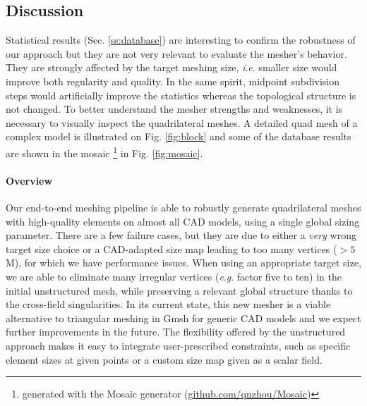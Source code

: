\documentclass[AMA,STIX1COL]{WileyNJD-v2}
\newcommand{\ie}{\textit{i}.\textit{e}. }
\newcommand{\eg}{\textit{e}.\textit{g}. }
\newcommand\rsec[1]{Sec. \ref{#1}}
\newcommand\rfig[1]{Fig. \ref{#1}}
\begin{document}
{\subsection{Discussion}
\label{ss:discussion}

Statistical results (\rsec{ss:database}) are interesting to confirm the robustness
of our approach but they are not very relevant to evaluate the mesher's behavior.
They are strongly affected by the target meshing size, \ie smaller size
would improve both regularity and quality. In the same spirit, midpoint subdivision
steps would artificially improve the statistics whereas the topological structure is
not changed. To better understand the mesher strengths and weaknesses,
it is necessary to visually inspect the quadrilateral meshes.
A detailed quad mesh of a complex model is illustrated on \rfig{fig:block} 
and some of the database results are shown in the 
mosaic \footnote{generated with the Mosaic generator (\url{github.com/qnzhou/Mosaic})}
in \rfig{fig:mosaic}.

\paragraph{Overview}
Our end-to-end meshing pipeline is able to robustly generate
quadrilateral meshes with high-quality elements on almost all CAD models, using
a single global sizing parameter. There are a few failure cases,
but they are due to either a \emph{very} wrong target size choice or a
CAD-adapted size map leading to too many vertices ($>5$M), for which we have
performance issues. 
When using an appropriate target size, we are able to eliminate 
many irregular vertices (\eg factor five to ten) in the initial unstructured
mesh, while preserving a relevant global structure thanks to the cross-field
singularities. In its current state, this new mesher is a viable alternative
to triangular meshing in Gmsh for generic CAD models and we expect further improvements
in the future. The flexibility offered by the unstructured approach makes it easy
to integrate user-prescribed constraints, such as specific element sizes at
given points or a custom size map given as a scalar field.



}
\end{document}
